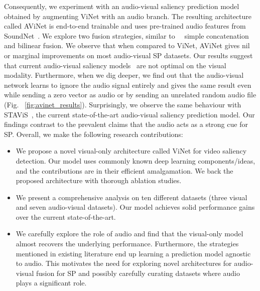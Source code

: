 \documentclass[letterpaper, 10 pt, conference]{ieeeconf}  \usepackage{times}
\begin{document}
Consequently, we experiment with an audio-visual saliency prediction model obtained by augmenting ViNet with an audio branch. The resulting architecture called AViNet is end-to-end trainable and uses pre-trained audio features from SoundNet~\cite{aytar2016soundnet}. We explore two fusion strategies, similar to~\cite{tsiami2020stavis, tavakoli2019dave} \ie \ simple concatenation and bilinear fusion. We observe that when compared to ViNet, AViNet gives nil or marginal improvements on most audio-visual SP datasets. Our results suggest that current audio-visual saliency models~\cite{tavakoli2019dave,tsiami2020stavis} are not optimal on the visual modality. Furthermore, when we dig deeper, we find out that the audio-visual network learns to ignore the audio signal entirely and gives the same result even while sending a zero vector as audio or by sending an unrelated random audio file (Fig. ~\ref{fig:avinet_results}). Surprisingly, we observe the same behaviour with STAViS~\cite{tsiami2020stavis}, the current state-of-the-art audio-visual saliency prediction model. Our findings contrast to the prevalent claims that the audio acts as a strong cue for SP. Overall, we make the following research contributions:





\begin{itemize}
    \item We propose a novel visual-only architecture called ViNet for video saliency detection. Our model uses commonly known deep learning components/ideas, and the contributions are in their efficient amalgamation. We back the proposed architecture with thorough ablation studies.
    \item We present a comprehensive analysis on ten different datasets (three visual and seven audio-visual datasets). Our model achieves solid performance gains over the current state-of-the-art.
     \item  We carefully explore the role of audio and find that the visual-only model almost recovers the underlying performance. Furthermore, the strategies mentioned in existing literature end up learning a prediction model agnostic to audio. This motivates the need for exploring novel architectures for audio-visual fusion for SP and possibly carefully curating datasets where audio plays a significant role. 
\end{itemize}
    
\end{document}

